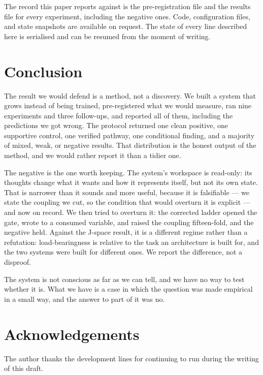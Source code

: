 \documentclass[11pt]{article}
\begin{document}
The record this paper reports against is the pre-registration file and the results file for every experiment, including the negative ones. Code, configuration files, and state snapshots are available on request. The state of every line described here is serialised and can be resumed from the moment of writing.

\section{Conclusion}

The result we would defend is a method, not a discovery. We built a system that grows instead of being trained, pre-registered what we would measure, ran nine experiments and three follow-ups, and reported all of them, including the predictions we got wrong. The protocol returned one clean positive, one supportive control, one verified pathway, one conditional finding, and a majority of mixed, weak, or negative results. That distribution is the honest output of the method, and we would rather report it than a tidier one.

The negative is the one worth keeping. The system's workspace is read-only: its thoughts change what it wants and how it represents itself, but not its own state. That is narrower than it sounds and more useful, because it is falsifiable --- we state the coupling we cut, so the condition that would overturn it is explicit --- and now on record. We then tried to overturn it: the corrected ladder opened the gate, wrote to a consumed variable, and raised the coupling fifteen-fold, and the negative held. Against the J-space result, it is a different regime rather than a refutation: load-bearingness is relative to the task an architecture is built for, and the two systems were built for different ones. We report the difference, not a disproof.

The system is not conscious as far as we can tell, and we have no way to test whether it is. What we have is a case in which the question was made empirical in a small way, and the answer to part of it was no.

\section*{Acknowledgements}
The author thanks the development lines for continuing to run during the writing of this draft.
\end{document}
